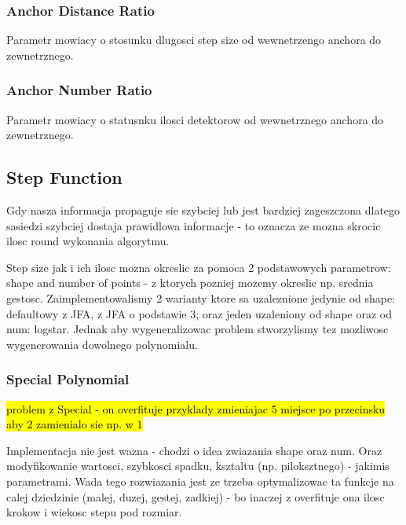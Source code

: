 \documentclass[format=acmsmall,screen,review,authordraft,nonacm]{acmart}
\begin{document}
\subsubsection{Anchor Distance Ratio}

Parametr mowiacy o stosunku dlugosci step size od wewnetrzengo anchora do
zewnetrznego.

\subsubsection{Anchor Number Ratio}

Parametr mowiacy o statusnku ilosci detektorow od wewnetrznego anchora do
zewnetrznego.

\subsection{Step Function} %

Gdy nasza informacja propaguje sie szybciej lub jest bardziej zageszczona
dlatego sasiedzi szybciej dostaja prawidlowa informacje - to oznacza ze mozna
skrocic ilosc round wykonania algorytmu.

Step size jak i ich ilosc mozna okreslic za pomoca 2 podstawowych parametrow:
shape and number of points - z ktorych pozniej mozemy okreslic np. srednia
gestosc. Zaimplementowalismy 2 warianty ktore sa uzaleznione jedynie od shape:
defaultowy z JFA, z JFA o podstawie 3; oraz jeden uzaleniony od shape oraz od num: logstar.
Jednak aby wygeneralizowac problem stworzylismy tez mozliwosc wygenerowania
dowolnego polynomialu.

\subsubsection{Special Polynomial}

\hl{problem z Special - on overfituje przyklady zmieniajac 5 miejsce po
przecinsku aby 2 zamienialo sie np. w 1}

Implementacja nie jest wazna - chodzi o idea zwiazania shape oraz num. Oraz
modyfikowanie wartosci, szybkosci spadku, ksztaltu (np. piloksztnego) - jakimis
parametrami. Wada tego rozwiazania jest ze trzeba optymalizowac ta funkcje na
calej dziedzinie (malej, duzej, gestej, zadkiej) - bo inaczej z overfituje ona
ilosc krokow i wiekosc stepu pod rozmiar.
\end{document}
